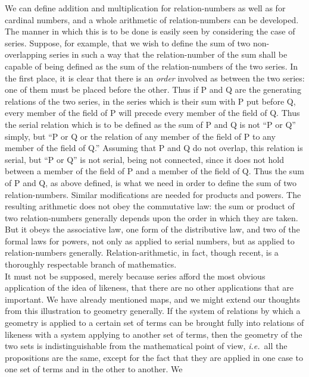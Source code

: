 {We can define addition and multiplication for
re\-la\-tion-num\-bers
as well
as for cardinal numbers, and a whole arithmetic of re\-la\-tion-num\-bers can
be developed. The manner in which this is to be done is easily seen by
considering the case of series. Suppose, for example, that we wish to
define the sum of two
non-overlapping series in such a way that the relation-number of the
sum shall be capable of being defined as the sum of the
relation-numbers of the two series. In the first place, it is clear
that there is an \textit{order}
involved as between the two series: one of them
must be placed before the other. Thus if P and Q are the generating
relations of the two series, in the series which is their sum with P
put before Q, every member of the field of P will precede every member
of the field of Q. Thus the serial relation which is to be defined as
the sum of P and Q is not ``P or Q'' simply, but ``P or Q or the relation
of any member of the field of P to any member of the field of Q.''
Assuming that P and Q do not overlap, this relation is serial, but ``P
or Q'' is not serial, being not connected, since it does not hold
between a member of the field of P and a member of the field of Q. Thus
the sum of P and Q, as above defined, is what we 
need in order   to
define the sum of two relation-numbers. Similar modifications are
needed for products and powers. The resulting arithmetic does not obey
the commutative law: the sum or product of two relation-numbers
generally depends upon the order in which they are taken. But it obeys
the associative law, one form of the distributive law, and two of the
formal laws for powers, not only as applied to serial numbers, but as
applied to relation-numbers generally. Relation-arithmetic, in fact,
though recent, is a thoroughly respectable branch of mathematics.\\
\indent It must not be supposed, merely because series afford
the
most
obvious
application of the idea of likeness, that there are no other
applications that are important. We have already mentioned maps, and we
might extend our thoughts from this illustration to geometry generally.
If the system of relations by which a geometry is applied to a certain
set of terms can be brought fully into relations of likeness with a
system applying to another set of terms, then the geometry of the two
sets is indistinguishable from the mathematical point of view, \textit{i.e.}\ all
the propositions are the same, except for the fact that they are
applied in one case to one set of terms and in the other to another. We
}
